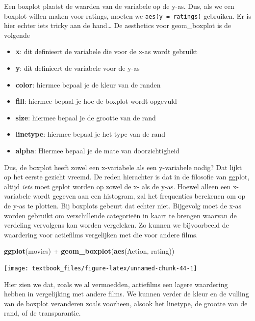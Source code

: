 \documentclass[]{tufte-book}
\newenvironment{Shaded}{}{}
\newcommand{\KeywordTok}[1]{\textcolor[rgb]{0.00,0.44,0.13}{\textbf{#1}}}
\newcommand{\NormalTok}[1]{#1}
\newcommand{\OperatorTok}[1]{\textcolor[rgb]{0.40,0.40,0.40}{#1}}
\newcommand{\StringTok}[1]{\textcolor[rgb]{0.25,0.44,0.63}{#1}}
\providecommand{\tightlist}{%
  \setlength{\itemsep}{0pt}\setlength{\parskip}{0pt}}
\begin{document}
Een boxplot plaatst de waarden van de variabele op de y-as. Dus, als we een boxplot willen maken voor ratings, moeten we \texttt{aes(y\ =\ ratings)} gebruiken. Er is hier echter iets tricky aan de hand\ldots{} De aesthetics voor geom\_boxplot is de volgende

\begin{itemize}
\tightlist
\item
  \textbf{x}: dit definieert de variabele die voor de x-as wordt gebruikt
\item
  \textbf{y}: dit definieert de variabele voor de y-as
\item
  \textbf{color}: hiermee bepaal je de kleur van de randen
\item
  \textbf{fill}: hiermee bepaal je hoe de boxplot wordt opgevuld
\item
  \textbf{size}: hiermee bepaal je de grootte van de rand
\item
  \textbf{linetype}: hiermee bepaal je het type van de rand
\item
  \textbf{alpha}: Hiermee bepaal je de mate van doorzichtigheid
\end{itemize}

Dus, de boxplot heeft zowel een x-variabele als een y-variabele nodig? Dat lijkt op het eerste gezicht vreemd. De reden hierachter is dat in de filosofie van ggplot, altijd \emph{iets} moet geplot worden op zowel de x- als de y-as. Hoewel alleen een x-variabele wordt gegeven aan een histogram, zal het frequenties berekenen om op de y-as te plotten. Bij boxplots gebeurt dat echter niet. Bijgevolg moet de x-as worden gebruikt om verschillende categorieën in kaart te brengen waarvan de verdeling vervolgens kan worden vergeleken. Zo kunnen we bijvoorbeeld de waardering voor actiefilms vergelijken met die voor andere films.

\begin{Shaded}
\begin{Highlighting}[]
\KeywordTok{ggplot}\NormalTok{(movies) }\OperatorTok{+}\StringTok{ }
\StringTok{    }\KeywordTok{geom_boxplot}\NormalTok{(}\KeywordTok{aes}\NormalTok{(Action, rating))}
\end{Highlighting}
\end{Shaded}

\texttt{[image: textbook\_files/figure-latex/unnamed-chunk-44-1]}

Hier zien we dat, zoals we al vermoedden, actiefilms een lagere waardering hebben in vergelijking met andere films. We kunnen verder de kleur en de vulling van de boxplot veranderen zoals voorheen, alsook het linetype, de grootte van de rand, of de transparantie.
\end{document}
